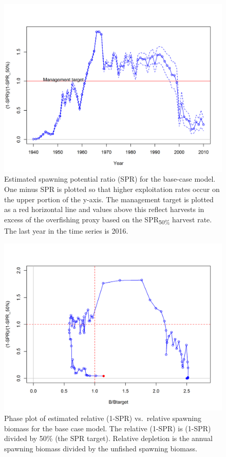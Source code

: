 \documentclass[12pt,]{article}
\begin{document}
\FloatBarrier

\begin{figure}
\centering
\includegraphics{r4ss/plots_mod1/SPR3_ratiointerval.png}
\caption{Estimated spawning potential ratio (SPR) for the base-case
model. One minus SPR is plotted so that higher exploitation rates occur
on the upper portion of the y-axis. The management target is plotted as
a red horizontal line and values above this reflect harvests in excess
of the overfishing proxy based on the SPR\textsubscript{50\%} harvest
rate. The last year in the time series is 2016. \label{fig:SPR_all}}
\end{figure}

\begin{figure}
\centering
\includegraphics{r4ss/plots_mod1/SPR4_phase.png}
\caption{Phase plot of estimated relative (1-SPR) vs.~relative spawning
biomass for the base case model. The relative (1-SPR) is (1-SPR) divided
by 50\% (the SPR target). Relative depletion is the annual spawning
biomass divided by the unfished spawning biomass. \label{fig:Phase_all}}
\end{figure}
\end{document}
